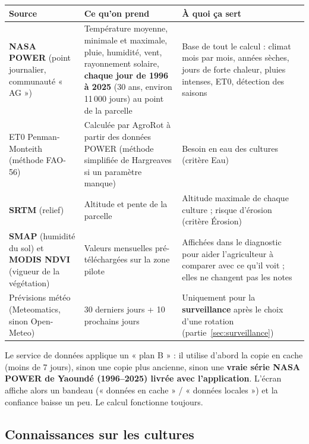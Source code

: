 \documentclass[11pt,a4paper]{article}
\begin{document}
\begin{center}
\begin{tabularx}{\textwidth}{L{3.1cm}L{4.4cm}Y}
\toprule
\textbf{Source} & \textbf{Ce qu'on prend} & \textbf{À quoi ça sert} \\
\midrule
\textbf{NASA POWER} (point journalier, communauté « AG ») & Température moyenne, minimale et maximale, pluie, humidité, vent, rayonnement solaire, \textbf{chaque jour de 1996 à 2025} (30 ans, environ 11\,000 jours) au point de la parcelle & Base de tout le calcul : climat mois par mois, années sèches, jours de forte chaleur, pluies intenses, ET0, détection des saisons \\
ET0 Penman-Monteith (méthode FAO-56) & Calculée par AgroRot à partir des données POWER (méthode simplifiée de Hargreaves si un paramètre manque) & Besoin en eau des cultures (critère Eau) \\
\textbf{SRTM} (relief) & Altitude et pente de la parcelle & Altitude maximale de chaque culture ; risque d'érosion (critère Érosion) \\
\textbf{SMAP} (humidité du sol) et \textbf{MODIS NDVI} (vigueur de la végétation) & Valeurs mensuelles pré-téléchargées sur la zone pilote & Affichées dans le diagnostic pour aider l'agriculteur à comparer avec ce qu'il voit ; elles ne changent pas les notes \\
Prévisions météo (Meteomatics, sinon Open-Meteo) & 30 derniers jours + 10 prochains jours & Uniquement pour la \textbf{surveillance} après le choix d'une rotation (partie~\ref{sec:surveillance}) \\
\bottomrule
\end{tabularx}
\end{center}

\begin{attention}
Le service de données applique un « plan B » : il utilise d'abord la copie en cache (moins de 7 jours), sinon une
copie plus ancienne, sinon une \textbf{vraie série NASA POWER de Yaoundé (1996–2025) livrée avec l'application}.
L'écran affiche alors un bandeau (« données en cache » / « données locales ») et la confiance baisse un peu.
Le calcul fonctionne toujours.
\end{attention}

\subsection{Connaissances sur les cultures}
\end{document}
